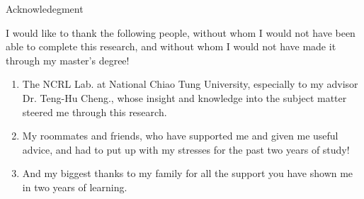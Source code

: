 \newpage
\begin{center}
  \LARGE


    
  Acknowledegment \\[0.5cm]	
\end{center}

\normalsize 
I would like to thank the following people, without whom I would not have been able to complete this research, and without whom I would not have made it through my master's degree!
\begin{enumerate}
  \item The NCRL Lab. at National Chiao Tung University, especially to my advisor Dr. Teng-Hu Cheng., whose insight and knowledge into the subject matter steered me through this research.
  \item My roommates and friends, who have supported me and given me useful advice, and had to put up with my stresses for the past two years of study!
  \item And my biggest thanks to my family for all the support you have shown me in two years of learning.
\end{enumerate}